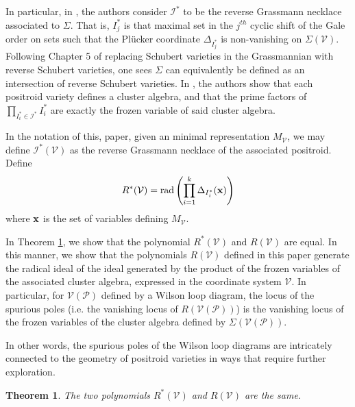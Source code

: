 \documentclass[11pt]{article}
\newcommand{\cP}{\mathcal{P}}
\newcommand{\cV}{\mathcal{V}}
\newcommand{\VP}{\cV(\cP)}
\newcommand{\cI}{\mathcal{I}}
\newtheorem{thm}{Theorem}[section]
\theoremstyle{remark}
\theoremstyle{definition}
\begin{document}
In particular, in \cite{galashinlam19}, the authors consider $\cI^*$ to be the reverse Grassmann necklace associated to $\Sigma$. That is, $I^{\ast}_j$ is that maximal set in the $j^{th}$ cyclic shift of the Gale order on sets such that the Pl\"{u}cker coordinate $\Delta_{I^*_j}$ is non-vanishing on $\Sigma(\cV)$. Following Chapter 5 of \cite{Juggling} replacing Schubert varieties in the Grassmannian with reverse Schubert varieties, one sees $\Sigma$ can equivalently be defined as an intersection of reverse Schubert varieties. In \cite{SS-BW}, the authors show that each positroid variety defines a cluster algebra, and that the prime factors of $\prod_{I_i^\ast \in \cI^\ast}I_i^\ast$ are exactly the frozen variable of said cluster algebra. 

In the notation of this, paper, given an minimal representation $M_{\cV}$, we may define $\cI^\ast(\cV)$ as the reverse Grassmann necklace of the associated positroid. Define
%
\begin{displaymath}
R^{\ast}(\cV) = \mathrm{rad}\left(\prod_{i = 1}^{k} \Delta_{I^{\ast}_i}(\bf{x})\right)
\end{displaymath}
where $\bf{x}$ is the set of variables defining $M_{\cV}$.

In Theorem \ref{res:reversepoly}, we show that the polynomial $R^{\ast}(\cV)$ and $R(\cV)$ are equal. In this manner, we show that the polynomials $R(\cV)$ defined in this paper generate the radical ideal of the ideal generated by the product of the frozen variables of the associated cluster algebra, expressed in the coordinate system $\cV$. In particular, for $\VP$ defined by a Wilson loop diagram, the locus of the spurious poles (i.e. the vanishing locus of $R(\VP)$) is the vanishing locus of the frozen variables of the cluster algebra defined by $\Sigma(\VP)$. 

In other words, the spurious poles of the Wilson loop diagrams are intricately connected to the geometry of positroid varieties in ways that require further exploration.

\begin{thm}\label{res:reversepoly}
The two polynomials $R^{\ast}(\cV)$ and $R(\cV)$ are the same.
\end{thm}
\end{document}
